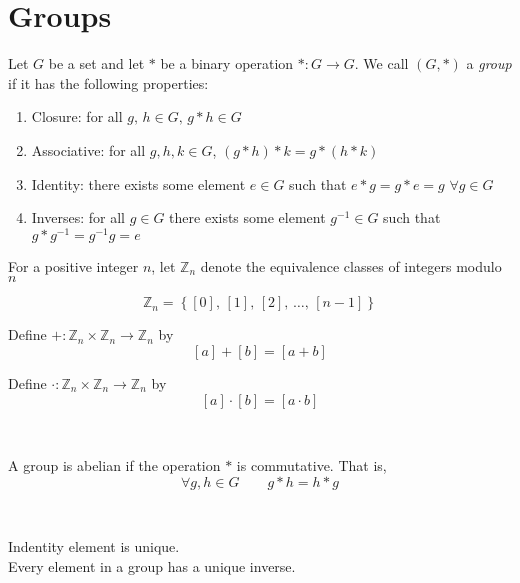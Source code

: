 \section{Groups}
\begin{definition}
    Let $G$ be a set and let $*$ be a binary operation $*:G\to G$. We call $(G, *)$ a \emph{group} if it has the following properties:
    \begin{enumerate}
        \item Closure: for all $g,\,h\in G,\, g*h\in G$
        \item Associative: for all $g,h,k\in G$, $(g*h)*k = g*(h*k)$
        \item Identity: there exists some element $e\in G$ such that $e*g = g*e = g$ $\forall g\in G$
        \item Inverses: for all $g\in G$ there exists some element $g^{-1}\in G$ such that $g*g^{-1} = g^{-1}g = e$
    \end{enumerate}
\end{definition}

\begin{definition}
    For a positive integer $n$, let $\mathbb Z_n$ denote the equivalence classes of integers modulo $n$

    $$\mathbb Z_n = \left\{[0],\,[1],\,[2],\,\dots,\,[n-1]\right\}$$

    Define $+:\mathbb Z_n \times \mathbb Z_n \to \mathbb Z_n$ by $$[a] + [b] = [a+b]$$

    Define $\cdot:\mathbb Z_n \times \mathbb Z_n \to \mathbb Z_n$ by $$[a] \cdot [b] = [a\cdot b]$$
\end{definition}\\
\begin{definition}
    A group is abelian if the operation \(*\) is commutative. That is,
    \[\forall g, h\in G \qquad g*h = h*g\]
\end{definition}\\
\begin{theorm}
    Indentity element is unique.\\
    Every element in a group has a unique inverse.\\
\end{theorm}
